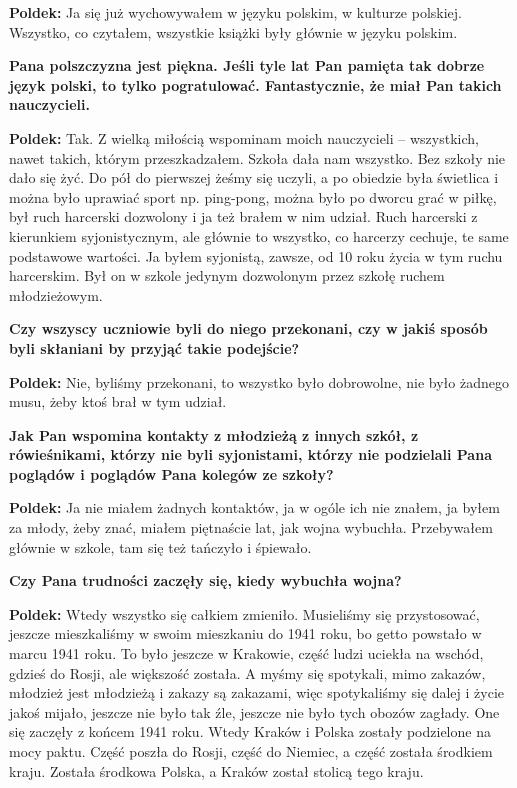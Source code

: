 \begin{otherlanguage}{polish}
\textbf{Poldek:} Ja się już wychowywałem w języku polskim, w kulturze polskiej. Wszystko, co czytałem, wszystkie książki były głównie w języku polskim.
 
\textbf{Pana polszczyzna jest piękna. Jeśli tyle lat Pan pamięta tak dobrze język polski, to tylko pogratulować. Fantastycznie, że miał Pan takich nauczycieli.}

\textbf{Poldek:} Tak. Z wielką miłością wspominam moich nauczycieli – wszystkich, nawet takich, którym przeszkadzałem. Szkoła dała nam wszystko. Bez szkoły nie dało się żyć. Do pół do pierwszej żeśmy się uczyli, a po obiedzie była świetlica i można było uprawiać sport np. ping-pong, można było po dworcu grać w piłkę, był ruch harcerski dozwolony i ja też brałem w nim udział. Ruch harcerski z kierunkiem syjonistycznym, ale głównie to wszystko, co harcerzy cechuje, te same podstawowe wartości. Ja byłem syjonistą, zawsze, od 10 roku życia w tym ruchu harcerskim. Był on w szkole jedynym dozwolonym przez szkołę ruchem młodzieżowym.

\textbf{Czy wszyscy uczniowie byli do niego przekonani, czy w jakiś sposób byli skłaniani by przyjąć takie podejście?}

\textbf{Poldek:} Nie, byliśmy przekonani, to wszystko było dobrowolne, nie było żadnego musu, żeby ktoś brał w tym udział. 
  
\textbf{Jak Pan wspomina kontakty z młodzieżą z innych szkół, z rówieśnikami, którzy nie byli syjonistami, którzy nie podzielali Pana poglądów i poglądów Pana kolegów ze szkoły?}
 
\textbf{Poldek:} Ja nie miałem żadnych kontaktów, ja w ogóle ich nie znałem, ja byłem za młody, żeby znać, miałem piętnaście lat, jak wojna wybuchła. Przebywałem głównie w szkole, tam się też tańczyło i śpiewało.

\textbf{Czy Pana trudności zaczęły się, kiedy wybuchła wojna?}

\textbf{Poldek:} Wtedy wszystko się całkiem zmieniło. Musieliśmy się przystosować, jeszcze mieszkaliśmy w swoim mieszkaniu do 1941 roku, bo getto powstało w marcu 1941 roku. To było jeszcze w Krakowie, część ludzi uciekła na wschód, gdzieś do Rosji, ale większość została. A myśmy się spotykali, mimo zakazów, młodzież jest młodzieżą i zakazy są zakazami, więc spotykaliśmy się dalej i życie jakoś mijało, jeszcze nie było tak źle, jeszcze nie było tych obozów zagłady. One się zaczęły z końcem 1941 roku. Wtedy Kraków i Polska zostały podzielone na mocy paktu. Część poszła do Rosji, część do Niemiec, a część została środkiem kraju. Została środkowa Polska, a Kraków został stolicą tego kraju. 


\end{otherlanguage}
